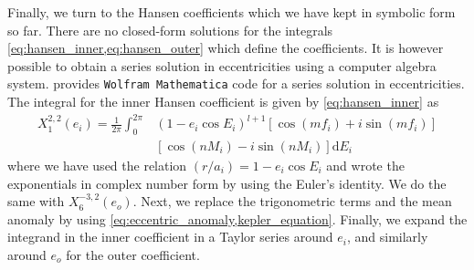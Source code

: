 Finally, we turn to the Hansen coefficients which we have kept in symbolic 
form so far. There are no closed-form solutions for the integrals 
\cref{eq:hansen_inner,eq:hansen_outer} which define the coefficients. 
It is however possible to obtain a series solution in eccentricities 
using a computer algebra system. 
\Cite{Mardling2013} provides \texttt{Wolfram Mathematica} \citep{Mathematica} code 
for a series solution in eccentricities. The integral
for the inner Hansen coefficient is given by \cref{eq:hansen_inner} as
\begin{equation}
    \begin{aligned}
        X^{2,2}_1(e_i)= \frac{1}{2\pi} \int^{2\pi}_0 &(1-e_i\cos E_i)^{l+1}
        \left[\cos(mf_i)+i\sin(mf_i)\right]\\
        &\left[\cos(nM_i)-i\sin(nM_i)\right]\mathrm{d}E_i
    \end{aligned}
\end{equation}
where we have used the relation $(r/a_i)=1-e_i\cos E_i$ and wrote the 
exponentials in complex number form by using the Euler's identity. We 
do the same with $X^{-3,2}_6(e_o)$. Next, we replace the trigonometric 
terms and the mean anomaly
by using \cref{eq:eccentric_anomaly,kepler_equation}. Finally,
we expand the integrand in the inner coefficient in a Taylor series 
around $e_i$, and similarly around $e_o$ for the outer coefficient.


